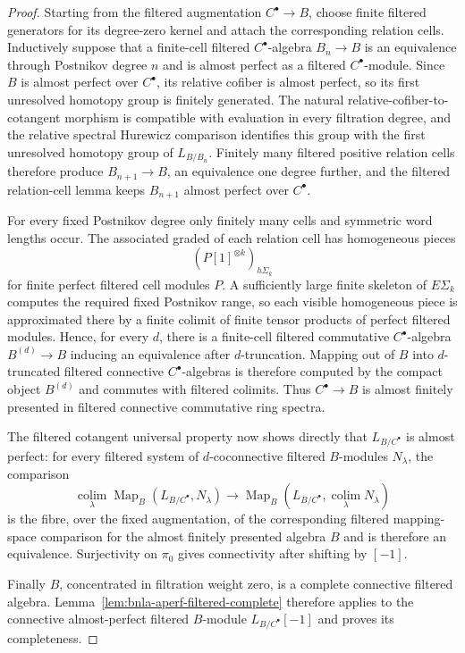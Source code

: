 \begin{proof}
Starting from the filtered augmentation $C^\bullet\to B$, choose finite
filtered generators for its degree-zero kernel and attach the corresponding
relation cells.  Inductively suppose that a finite-cell filtered
$C^\bullet$-algebra $B_n\to B$ is an equivalence through Postnikov degree $n$
and is almost perfect as a filtered $C^\bullet$-module.  Since $B$ is almost
perfect over $C^\bullet$, its relative cofiber is almost perfect, so its first
unresolved homotopy group is finitely generated.  The natural
relative-cofiber-to-cotangent morphism is compatible with evaluation in every
filtration degree, and the relative spectral Hurewicz comparison identifies
this group with the first unresolved homotopy group of $L_{B/B_n}$.  Finitely
many filtered positive relation cells therefore produce $B_{n+1}\to B$, an
equivalence one degree further, and the filtered relation-cell lemma keeps
$B_{n+1}$ almost perfect over $C^\bullet$.

For every fixed Postnikov degree only finitely many cells and symmetric word
lengths occur.  The associated graded of each relation cell has homogeneous
pieces
\[
    \left(P[1]^{\otimes k}\right)_{h\Sigma_k}
\]
for finite perfect filtered cell modules $P$.  A sufficiently large finite
skeleton of $E\Sigma_k$ computes the required fixed Postnikov range, so each
visible homogeneous piece is approximated there by a finite colimit of finite
tensor products of perfect filtered modules.  Hence, for every $d$, there is
a finite-cell filtered commutative $C^\bullet$-algebra $B^{(d)}\to B$ inducing
an equivalence after $d$-truncation.  Mapping out of $B$ into $d$-truncated
filtered connective $C^\bullet$-algebras is therefore computed by the compact
object $B^{(d)}$ and commutes with filtered colimits.  Thus
$C^\bullet\to B$ is almost finitely presented in filtered connective
commutative ring spectra.

The filtered cotangent universal property now shows directly that
$L_{B/C^\bullet}$ is almost perfect: for every filtered system of
$d$-coconnective filtered $B$-modules $N_\lambda$, the comparison
\[
\operatorname*{colim}_\lambda
\operatorname{Map}_B(L_{B/C^\bullet},N_\lambda)
\longrightarrow
\operatorname{Map}_B
\left(L_{B/C^\bullet},\operatorname*{colim}_\lambda N_\lambda\right)
\]
is the fibre, over the fixed augmentation, of the corresponding filtered
mapping-space comparison for the almost finitely presented algebra $B$ and is
therefore an equivalence.  Surjectivity on $\pi_0$ gives connectivity after
shifting by $[-1]$.

Finally $B$, concentrated in filtration weight zero, is a complete connective
filtered algebra.  Lemma~\ref{lem:bnla-aperf-filtered-complete} therefore
applies to the connective almost-perfect filtered $B$-module
$L_{B/C^\bullet}[-1]$ and proves its completeness.
\end{proof}

